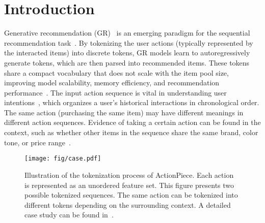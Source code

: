 \section{Introduction}

Generative recommendation (GR)~\cite{geng2022p5,rajput2023tiger,zheng2024lcrec,zhai2024hstu} is an emerging paradigm for the sequential recommendation task~\cite{hidasi2016gru4rec,kang2018sasrec}. By tokenizing the user actions (typically represented by the interacted items) into discrete tokens, GR models learn to autoregressively generate tokens, which are then parsed into recommended items.
These tokens share a compact vocabulary that does not scale with the item pool size, improving model scalability, memory efficiency, and recommendation performance~\cite{rajput2023tiger,zhai2024hstu}.
The input action sequence is vital in understanding user intentions~\cite{li2017narm,kang2018sasrec}, which organizes a user's historical interactions in chronological order. The same action (\eg purchasing the same item) may have different meanings in different action sequences. Evidence of taking a certain action can be found in the context, such as whether other items in the sequence share the same brand, color tone, or price range~\cite{zhang2019fdsa,zhou2020s3,hou2022unisrec,hou2023vqrec,yuan2023go}.

\begin{figure}[!t]
    \begin{center}
    \texttt{[image: fig/case.pdf]}
    \vskip -0.05in
    \caption{Illustration of the tokenization process of ActionPiece. Each action is represented as an unordered feature set. 
    This figure presents two possible tokenized sequences. The same action can be tokenized into different tokens depending on the surrounding context. A detailed case study can be found in~.
    }
    \label{fig:case}
    \end{center}
    \vskip -0.2in
\end{figure}

